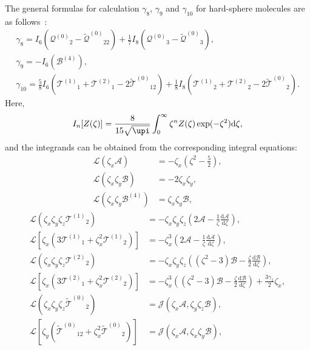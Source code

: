 \documentclass[]{jfm}
\newcommand{\dd}{\mathrm{d}}
\newcommand{\der}[2][]{\frac{\dd#1}{\dd#2}}
\newcommand{\B}{\ensuremath{\mathcal{B}^{(4)}}}
\newcommand{\Q}{\ensuremath{\mathcal{Q}^{(0)}}}
\newcommand{\T}[1]{\ensuremath{\mathcal{T}^{(#1)}}}
\newcommand{\TT}{\ensuremath{\tilde{\mathcal{T}}^{(0)}}}
\newcommand{\QQ}{\ensuremath{\tilde{\mathcal{Q}}^{(0)}}}
\begin{document}
The general formulas for calculation \(\gamma_8\), \(\gamma_9\) and \(\gamma_{10}\)
for hard-sphere molecules are as follows~\citep{Sone2000, Sone2002, Sone2007}:
\begin{gather}
    \gamma_8 = I_6\left(\Q_2 - \QQ_{22}\right) + \frac17 I_8\left(\Q_3 - \QQ_3\right), \label{eq:gamma_8}\\
    \gamma_9 = -I_6\left(\B\right), \label{eq:gamma_9}\\
    \gamma_{10} = \frac58 I_6\left(\T{1}_1 + \T{2}_1 - 2\TT_{12}\right)
        + \frac18 I_8\left(\T{1}_2 + \T{2}_2 - 2\TT_2\right). \label{eq:gamma_10}
\end{gather}
Here,
\begin{equation}\label{eq:I_n}
    I_n[Z(\zeta)] = \frac{8}{15\sqrt{\upi}} \int_0^\infty \zeta^n Z(\zeta) \exp(-\zeta^2) \dd\zeta,
\end{equation}
and the integrands can be obtained from the corresponding integral equations:
\begin{align}
    \mathcal{L}\left(\zeta_x\mathcal{A}\right) &= -\zeta_x\left(\zeta^2-\frac52\right), \label{eq:A}\\
    \mathcal{L}\left(\zeta_x\zeta_y\mathcal{B}\right) &= -2\zeta_x\zeta_y, \label{eq:B}\\
    \mathcal{L}\left(\zeta_x\zeta_y\B\right) &= \zeta_x\zeta_y\mathcal{B}, \label{eq:B_4}
\end{align}
\begin{align}
    \mathcal{L}\left( \zeta_x\zeta_y\zeta_z\T{1}_2 \right)
        &= -\zeta_x\zeta_y\zeta_z\left(2\mathcal{A} - \frac1\zeta\der[\mathcal{A}]{\zeta}\right), \label{eq:T2a}\\
    \mathcal{L}\left[ \zeta_x\left(3\T{1}_1 + \zeta_x^2\T{1}_2\right) \right]
        &= -\zeta_x^3\left(2\mathcal{A} - \frac1\zeta\der[\mathcal{A}]{\zeta}\right), \label{eq:T1a}\\
    \mathcal{L}\left( \zeta_x\zeta_y\zeta_z\T{2}_2 \right)
        &= -\zeta_x\zeta_y\zeta_z\left((\zeta^2-3)\mathcal{B} - \frac\zeta2\der[\mathcal{B}]{\zeta}\right), \label{eq:T2b}\\
    \mathcal{L}\left[ \zeta_x\left(3\T{2}_1 + \zeta_x^2\T{2}_2\right) \right]
        &= -\zeta_x^3\left((\zeta^2-3)\mathcal{B} - \frac\zeta2\der[\mathcal{B}]{\zeta}\right) + \frac{3\gamma_1}{2}\zeta_x, \label{eq:T1b}\\
    \mathcal{L}\left( \zeta_x\zeta_y\zeta_z\TT_2 \right)
        &= \mathcal{J}\left( \zeta_x\mathcal{A}, \zeta_y\zeta_z\mathcal{B} \right), \label{eq:TT2}\\
    \mathcal{L}\left[ \zeta_y\left(\TT_{12} + \zeta_x^2\TT_2\right) \right]
        &= \mathcal{J}\left( \zeta_x\mathcal{A}, \zeta_x\zeta_y\mathcal{B} \right), \label{eq:TT12}
\end{align}
\end{document}
